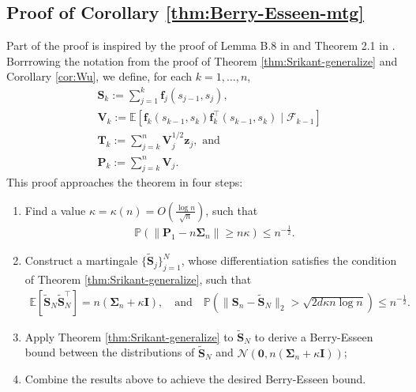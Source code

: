 \subsection{Proof of Corollary \ref{thm:Berry-Esseen-mtg}}\label{app:proof-Berry-Esseen-mtg}

Part of the proof is inspired by the proof of Lemma B.8 in \citet{cattaneo2024yurinskiiscouplingmartingales} and Theorem 2.1 in \cite{
belloni2018highdimensionalcentrallimit}.
Borrrowing the notation from the proof of Theorem \ref{thm:Srikant-generalize} and Corollary \ref{cor:Wu}, we define, for each $k=1,\ldots,n$,
\begin{align*}
&\bm{S}_k := \sum_{j=1}^k \bm{f}_j(s_{j-1},s_j), \\ 
&\bm{V}_k := \mathbb{E}[\bm{f}_k(s_{k-1},s_k) \bm{f}_k^\top(s_{k-1},s_k)\mid \mathscr{F}_{k-1}]   \\ 
&\bm{T}_k := \sum_{j=k}^n \bm{V}_j^{1/2}\bm{z}_j, \text{ and } \\ %
&\bm{P}_k := \sum_{j=k}^n \bm{V}_j.
\end{align*}
This proof approaches the theorem in four steps:
\begin{enumerate}
\item Find a value $\kappa = \kappa(n) = O(\frac{\log n}{\sqrt{n}})$, such that 
\begin{align*}
\mathbb{P}(\|\bm{P}_1 - n\bm{\Sigma}_n\| \geq n\kappa) \leq n^{-\frac{1}{2}}.
\end{align*}
\item Construct a martingale $\{\tilde{\bm{S}}_{j}\}_{j=1}^N$, whose differentiation satisfies the condition of Theorem \ref{thm:Srikant-generalize}, 
such that
\begin{align*}
\mathbb{E}[\tilde{\bm{S}}_N \tilde{\bm{S}}_N^\top] = n(\bm{\Sigma}_n + \kappa \bm{I}), \quad \text{and} \quad \mathbb{P}\left(\|\bm{S}_n - \tilde{\bm{S}}_{N}\|_2 > \sqrt{2d\kappa n  \log n}\right)\leq  n^{-\frac{1}{2}}.
\end{align*}
\item Apply Theorem \ref{thm:Srikant-generalize} to $\tilde{\bm{S}}_{N}$ to derive a Berry-Esseen bound between the distributions of $\tilde{\bm{S}}_{N}$ and $\mathcal{N}(\bm{0},n(\bm{\Sigma}_n + \kappa \bm{I}))$;
\item Combine the results above to achieve the desired Berry-Esseen bound.
\end{enumerate}
